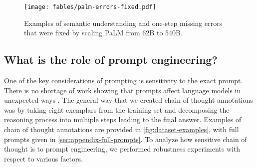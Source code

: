 \documentclass[]{article}
\theoremstyle{plain}
\theoremstyle{definition}
\theoremstyle{remark}
\newcommand{\palm}[0]{PaLM}
\begin{document}
\begin{figure}[t]
\centering
\texttt{[image: fables/palm-errors-fixed.pdf]}
\caption{
Examples of semantic understanding and one-step missing errors that were fixed by scaling \palm{} from 62B to 540B. 
}
\label{fig:palm-errors-fixed}
\end{figure} 

\subsection{What is the role of prompt engineering?}\label{subsec:faq-prompt-engineering}

One of the key considerations of prompting is sensitivity to the exact prompt. 
There is no shortage of work showing that prompts affect language models in unexpected ways \citep{min2022rethinking}.
The general way that we created chain of thought annotations was by taking eight exemplars from the training set and decomposing the reasoning process into multiple steps leading to the final answer. 
Examples of chain of thought annotations are provided in \cref{fig:dataset-examples}, with full prompts given in \cref{sec:appendix-full-prompts}.
To analyze how sensitive chain of thought is to prompt engineering, we performed robustness experiments with respect to various factors.
\end{document}
